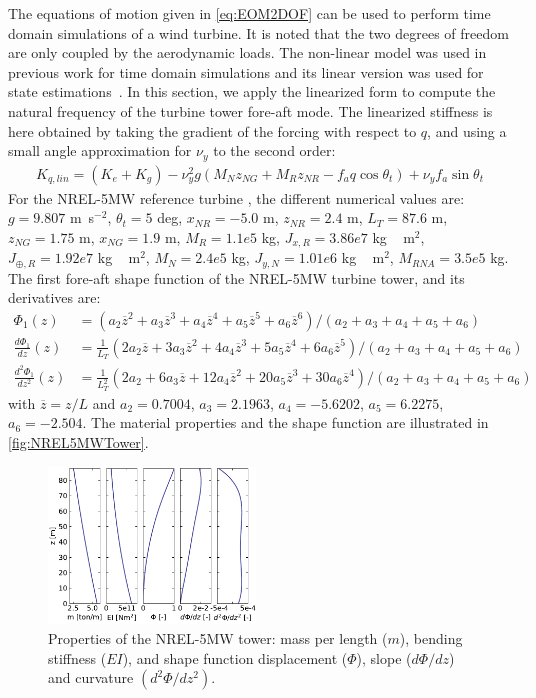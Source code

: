 \documentclass[wes, manuscript]{copernicus}
\renewcommand{\bar}{\overline}
\begin{document}
The equations of motion given in \autoref{eq:EOM2DOF} can be used to perform time domain simulations of a wind turbine. It is noted that the two degrees of freedom are only coupled by the aerodynamic loads. The non-linear model was used in previous work for time domain simulations and its linear version was used for state estimations~\citep{Branlard:2020twin,Branlard:2020twinOF}. In this section, we apply the linearized form to compute the natural frequency of the turbine tower fore-aft mode.
The linearized stiffness is here obtained by taking the gradient of the forcing with respect to $q$, and using a small angle approximation for $\nu_y$ to the second order:
\begin{align}
K_{q,lin}= (K_{e} + K_g)
- \nu_{y}^{2} g \left(M_N z_{NG} + M_{R} z_{NR} - f_a q \cos\theta_t\right)
+ \nu_{y} f_a \sin\theta_t 
\end{align}
For the NREL-5MW reference turbine \citep{nrel5mw}, the different numerical values are:
$g=9.807$ \unit{m.s}$^{-2}$,
$\theta_t=5$ \unit{deg},
$x_{NR}=-5.0$ \unit{m},
$z_{NR}= 2.4$ \unit{m},
$L_T=87.6$ \unit{m},
$z_{NG}=1.75$ \unit{m},
$x_{NG}=1.9$ \unit{m},
$M_R= 1.1e5$ \unit{kg},
$J_{x,R}=3.86e7$ \unit{kg\,m}$^2$,
$J_{\oplus,R}=1.92e7$ \unit{kg\,m}$^2$,
$M_N=2.4e5$ \unit{kg},
$J_{y,N} =1.01e6$ \unit{kg\,m}$^2$,
$M_{RNA}=3.5e5$ \unit{kg}.
The first fore-aft shape function of the NREL-5MW turbine tower, and its derivatives are:
\begin{align}
   \Phi_1(z) &= (a_2 \bar{z}^2+ a_3 \bar{z}^3+ a_4 \bar{z}^4+ a_5 \bar{z}^5+ a_6 \bar{z}^6)/(a_2+a_3+a_4+a_5+a_6)\nonumber \\
   \frac{d\Phi_1}{dz}(z) &= \frac{1}{L_T}(2a_2 \bar{z}+ 3a_3 \bar{z}^2+ 4a_4 \bar{z}^3+ 5a_5 \bar{z}^4+ 6a_6 \bar{z}^5)/(a_2+a_3+a_4+a_5+a_6)\label{eq:ShapeFunctionsPoly}  \\  
   \frac{d^2\Phi_1}{dz^2}(z) &= \frac{1}{L_T^2}(2a_2+ 6a_3 \bar{z}+ 12a_4 \bar{z}^2+ 20a_5 \bar{z}^3+ 30a_6 \bar{z}^4)/(a_2+a_3+a_4+a_5+a_6) 
   \nonumber
\end{align}
with $\bar{z}=z/L$ and $a_2=0.7004$, $ a_3=2.1963$, $a_4=-5.6202$, $a_5=6.2275$, $a_6=-2.504$.
The material properties and the shape function are illustrated in \autoref{fig:NREL5MWTower}. 
\noindent\begin{figure}[!htb]\centering%
  \includegraphics[width=0.49\textwidth]{figs/NREL5MWTower.pdf}
  \caption{Properties of the NREL-5MW tower: mass per length ($m$), bending stiffness ($EI$), and shape function displacement ($\Phi$), slope ($d\Phi/dz$) and curvature $(d^2\Phi/dz^2)$.}\label{fig:NREL5MWTower}%
\end{figure}
\end{document}

